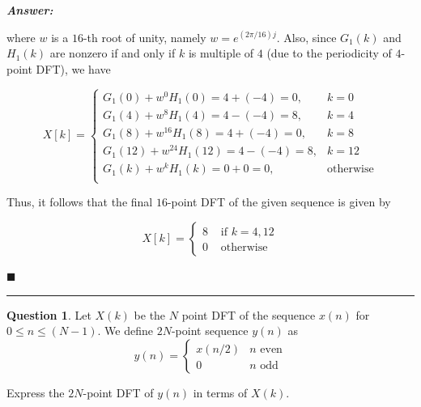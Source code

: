 \documentclass[12pt]{article}
\theoremstyle{definition}
\newtheorem{question}{Question}
\newenvironment{answer}{
    \textbf{\textit{Answer:}} \qquad
}{\hfill $\blacksquare$ \\ \begin{center}
    \rule{0.6\linewidth}{0.5px}    
\end{center}
}
\begin{document}
\begin{answer}
    where $w$ is a $16$-th root of unity, namely $w = e^{(2\pi/16)j}$. Also, since $G_1(k)$ and $H_1(k)$ are nonzero if and only if $k$ is multiple of $4$ (due to the periodicity of $4$-point DFT), we have 

    $$
    X[k] = \begin{cases}
        G_1(0) + w^0 H_1(0) = 4 + (-4) = 0, & k = 0\\
        G_1(4) + w^8 H_1(4) = 4 - (-4) = 8, & k = 4\\
        G_1(8) + w^{16} H_1(8) = 4 + (-4) = 0, & k = 8\\
        G_1(12) + w^{24} H_1(12) = 4 - (-4) = 8, & k = 12\\
        G_1(k) + w^k H_1(k) = 0 + 0 = 0, & \text{otherwise}\\
    \end{cases}
    $$


    Thus, it follows that the final $16$-point DFT of the given sequence is given by

    $$
    X[k] = \begin{cases}
        8 & \text{ if } k = 4, 12\\
        0 & \text{ otherwise }
    \end{cases}
    $$
    
\end{answer}



\begin{question}
    Let $X(k)$ be the $N$ point DFT of the sequence $x(n)$ for $0 \leq n \leq (N-1)$. We define $2N$-point sequence $y(n)$ as
    $$
    y(n) = \begin{cases}
        x(n/2) & n \text{ even}\\
        0 & n \text{ odd}
    \end{cases}
    $$

    Express the $2N$-point DFT of $y(n)$ in terms of $X(k)$.
\end{question}
\end{document}
